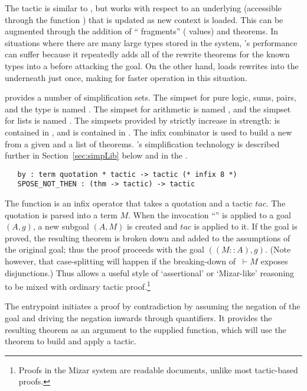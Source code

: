 { The tactic  is similar to
, but works with respect to an underlying \simpset{}
(accessible through the function ) that is updated as new
context is loaded.  This \simpset{} can be augmented through the
addition of ``\simpset{} fragments'' ( values) and
theorems.  In situations where there are many large types stored in
the system, 's performance can suffer because it
repeatedly adds all of the rewrite theorems for the known types into a
\simpset{} before attacking the goal.  On the other hand,
 loads rewrites into the \simpset{} underneath
 just once, making for faster operation in this
situation.

 provides a number of simplification sets. The
simpset for pure logic, sums, pairs, and the  type is
named . The simpset for arithmetic is named
, and the simpset for lists is named .
The simpsets provided by \bossLib{} strictly increase in strength:
 is contained in , and  is
contained in .  The infix combinator \ml{\&\&} is used
to build a new \simpset{} from a given \simpset{} and a list of
theorems. \HOL's simplification technology is described further in
Section~\ref{sec:simpLib} below and in the \REFERENCE.

\begin{hol}
\begin{verbatim}
   by : term quotation * tactic -> tactic (* infix 8 *)
   SPOSE_NOT_THEN : (thm -> tactic) -> tactic
\end{verbatim}
\end{hol}
The function  is an infix operator that takes a quotation
and a tactic $tac$. The quotation is parsed into a term $M$. When the
invocation ``'' is applied to a goal
$(A,g)$, a new subgoal $(A,M)$ is created and $tac$ is applied to it.
If the goal is proved, the resulting theorem is broken down and added
to the assumptions of the original goal; thus the proof proceeds with
the goal $((M::A), g)$. (Note however, that case-splitting will happen
if the breaking-down of $\ \vdash M$ exposes disjunctions.) Thus
 allows a useful style of `assertional' or `Mizar-like'
reasoning to be mixed with ordinary tactic proof.\footnote{Proofs in
  the Mizar system are readable documents, unlike most
  tactic-based proofs.}

The  entrypoint initiates a proof by
contradiction by assuming the negation of the goal and driving the
negation inwards through quantifiers. It provides the resulting
theorem as an argument to the supplied function, which will use the
theorem to build and apply a tactic.

}
